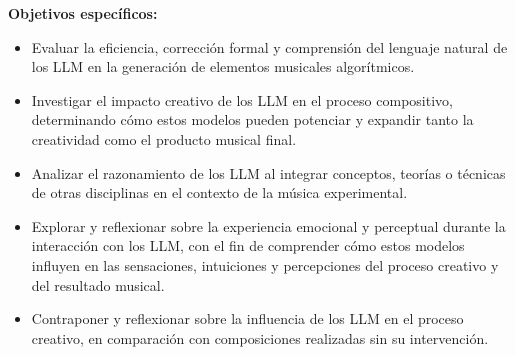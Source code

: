 \textbf{Objetivos específicos:}
\begin{itemize}
\item Evaluar la eficiencia, corrección formal y comprensión del lenguaje natural de los LLM en la generación de elementos musicales algorítmicos.
\item Investigar el impacto creativo de los LLM en el proceso compositivo, determinando cómo estos modelos pueden potenciar y expandir tanto la creatividad como el producto musical final.
\item Analizar el razonamiento de los LLM al integrar conceptos, teorías o técnicas de otras disciplinas en el contexto de la música experimental.
\item Explorar y reflexionar sobre la experiencia emocional y perceptual durante la interacción con los LLM, con el fin de comprender cómo estos modelos influyen en las sensaciones, intuiciones y percepciones del proceso creativo y del resultado musical.
\item Contraponer y reflexionar sobre la influencia de los LLM en el proceso creativo, en comparación con composiciones realizadas sin su intervención.
\end{itemize}
